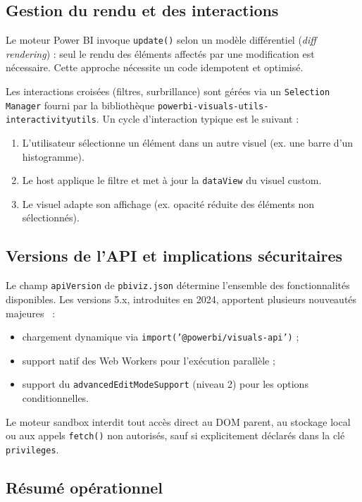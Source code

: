 \subsection{Gestion du rendu et des interactions}

Le moteur Power BI invoque \texttt{update()} selon un modèle différentiel (\emph{diff rendering}) : seul le rendu des éléments affectés par une modification est nécessaire. Cette approche nécessite un code idempotent et optimisé.

Les interactions croisées (filtres, surbrillance) sont gérées via un \texttt{Selection Manager} fourni par la bibliothèque \texttt{powerbi-visuals-utils-interactivityutils}. Un cycle d’interaction typique est le suivant :

\begin{enumerate}
  \item L’utilisateur sélectionne un élément dans un autre visuel (ex. une barre d’un histogramme).
  \item Le host applique le filtre et met à jour la \texttt{dataView} du visuel custom.
  \item Le visuel adapte son affichage (ex. opacité réduite des éléments non sélectionnés).
\end{enumerate}

\subsection{Versions de l’API et implications sécuritaires}

Le champ \texttt{apiVersion} de \texttt{pbiviz.json} détermine l’ensemble des fonctionnalités disponibles.  
Les versions 5.x, introduites en 2024, apportent plusieurs nouveautés majeures~\parencite{PBIAPIV5_2025} :

\begin{itemize}
  \item chargement dynamique via \texttt{import('@powerbi/visuals-api')} ;
  \item support natif des Web Workers pour l’exécution parallèle ;
  \item support du \texttt{advancedEditModeSupport} (niveau 2) pour les options conditionnelles.
\end{itemize}

Le moteur sandbox interdit tout accès direct au DOM parent, au stockage local ou aux appels \texttt{fetch()} non autorisés, sauf si explicitement déclarés dans la clé \texttt{privileges}.

\subsection*{Résumé opérationnel}

